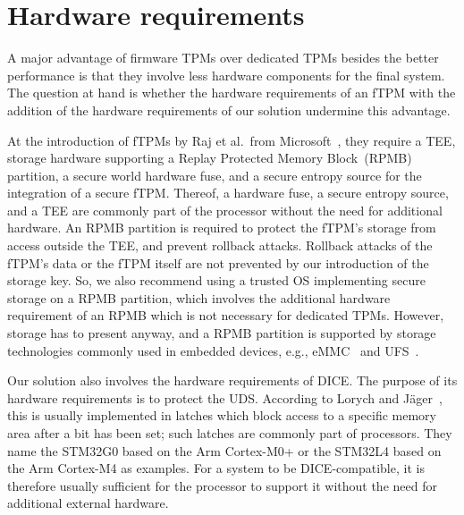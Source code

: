 \section{Hardware requirements}

A major advantage of firmware TPMs over dedicated TPMs besides the better performance is that they involve less hardware components for the final system.
The question at hand is whether the hardware requirements of an fTPM with the addition of the hardware requirements of our solution undermine this advantage.

At the introduction of \acp{fTPM} by Raj et al.\ from Microsoft~\cite{Raj2015}, they require a TEE, storage hardware supporting a Replay Protected Memory Block~(RPMB) partition, a secure world hardware fuse, and a secure entropy source for the integration of a secure \ac{fTPM}\@.
Thereof, a hardware fuse, a secure entropy source, and a TEE are commonly part of the processor without the need for additional hardware.
An RPMB partition is required to protect the fTPM's storage from access outside the TEE, and prevent rollback attacks.
Rollback attacks of the fTPM's data or the fTPM itself are not prevented by our introduction of the storage key.
So, we also recommend using a trusted OS implementing secure storage on a RPMB partition, which involves the additional hardware requirement of an RPMB which is not necessary for dedicated TPMs.
However, storage has to present anyway, and a RPMB partition is supported  by storage technologies commonly used in embedded devices, e.g., eMMC~\cite{eMMC} and UFS~\cite{UFS}.




Our solution also involves the hardware requirements of DICE\@.
The purpose of its hardware requirements is to protect the \ac{UDS}\@.
According to Lorych and Jäger~\cite{Lorych2022}, this is usually implemented in latches which block access to a specific memory area after a bit has been set; such latches are commonly part of processors.
They name the STM32G0 based on the Arm Cortex-M0+ or the STM32L4 based on the Arm Cortex-M4 as examples.
For a system to be DICE-compatible, it is therefore usually sufficient for the processor to support it without the need for additional external hardware.

